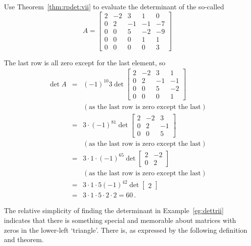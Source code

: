 \begin{example} \label{eg:dettrii}
Use Theorem~\ref{thm:rpdet:vii} to evaluate the determinant of the  so-called   
\begin{equation*}
A=\begin{bmatrix}2&-2&3&1&0
\\0&2&-1&-1&-7
\\0&0&5&-2&-9
\\0&0&0&1&1
\\0&0&0&0&3 \end{bmatrix}
\end{equation*}
\begin{solution} 
The last row is all zero except for the last element, so
\begin{eqnarray*}
\det A&=&(-1)^{10}3\det\begin{bmatrix}2&-2&3&1
\\0&2&-1&-1
\\0&0&5&-2
\\0&0&0&1\end{bmatrix}
\\&&(\text{as the last row is zero except the last})
\\&=&3\cdot (-1)^81\det\begin{bmatrix}2&-2&3
\\0&2&-1
\\0&0&5\end{bmatrix}
\\&&(\text{as the last row is zero except the last})
\\&=&3\cdot1\cdot(-1)^65\det\begin{bmatrix}2&-2
\\0&2\end{bmatrix}
\\&&(\text{as the last row is zero except the last})
\\&=&3\cdot1\cdot5(-1)^42\det\begin{bmatrix}2\end{bmatrix}
\\&=&3\cdot1\cdot5\cdot2\cdot2=60\,.
\end{eqnarray*}
\end{solution}
\end{example}


The relative simplicity of finding the determinant in Example~\ref{eg:dettrii} indicates that there is something special and memorable about matrices with zeros in the lower-left `triangle'.
There is, as expressed by the following definition and theorem.






